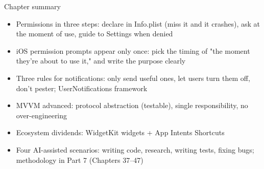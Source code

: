 \begin{tcbsummary}{Chapter summary}
\begin{itemize}
  \item Permissions in three steps: declare in Info.plist (miss it and it crashes), ask at the moment of use, guide to Settings when denied
  \item iOS permission prompts appear only once: pick the timing of "the moment they're about to use it," and write the purpose clearly
  \item Three rules for notifications: only send useful ones, let users turn them off, don't pester; UserNotifications framework
  \item MVVM advanced: protocol abstraction (testable), single responsibility, no over-engineering
  \item Ecosystem dividends: WidgetKit widgets + App Intents Shortcuts
  \item Four AI-assisted scenarios: writing code, research, writing tests, fixing bugs; methodology in Part 7 (Chapters 37–47)
\end{itemize}

\end{tcbsummary}
